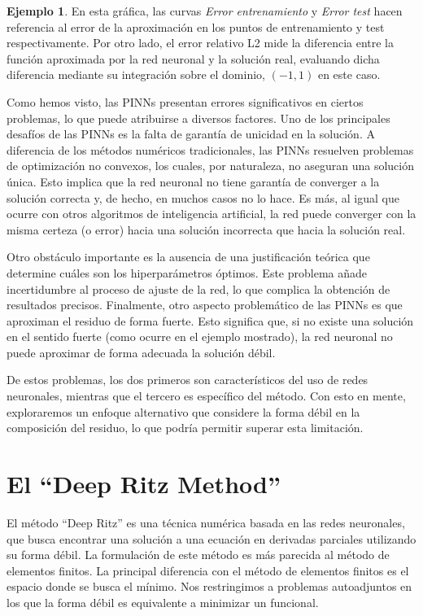 \documentclass[a4paper,11pt,spanish, twoside, leqno]{tfg-uam}
\theoremstyle{definition}
\newtheorem{exmp}[teor]{Ejemplo}
\begin{document}
\begin{mdframed}
\begin{exmp}
        En esta gráfica, las curvas \textit{Error entrenamiento} y \textit{Error test} hacen referencia al error de la aproximación en los puntos de entrenamiento y test respectivamente. Por otro lado, el error relativo L2 mide la diferencia entre la función aproximada por la red neuronal y la solución real, evaluando dicha diferencia mediante su integración sobre el dominio, $(-1,1)$ en este caso.

    \end{exmp}
\end{mdframed}

Como hemos visto, las PINNs presentan errores significativos en ciertos problemas, lo que puede atribuirse a diversos factores. Uno de los principales desafíos de las PINNs es la falta de garantía de unicidad en la solución. A diferencia de los métodos numéricos tradicionales, las PINNs resuelven problemas de optimización no convexos, los cuales, por naturaleza, no aseguran una solución única. Esto implica que la red neuronal no tiene garantía de converger a la solución correcta y, de hecho, en muchos casos no lo hace. Es más, al igual que ocurre con otros algoritmos de inteligencia artificial, la red puede converger con la misma certeza (o error) hacia una solución incorrecta que hacia la solución real.

Otro obstáculo importante es la ausencia de una justificación teórica que determine cuáles son los hiperparámetros óptimos. Este problema añade incertidumbre al proceso de ajuste de la red, lo que complica la obtención de resultados precisos. Finalmente, otro aspecto problemático de las PINNs es que aproximan el residuo de forma fuerte. Esto significa que, si no existe una solución en el sentido fuerte (como ocurre en el ejemplo mostrado), la red neuronal no puede aproximar de forma adecuada la solución débil.

De estos problemas, los dos primeros son característicos del uso de redes neuronales, mientras que el tercero es específico del método. Con esto en mente, exploraremos un enfoque alternativo que considere la forma débil en la composición del residuo, lo que podría permitir superar esta limitación.


\section{El ``Deep Ritz Method''} \label{sec:DeepRitz}

El método ``Deep Ritz'' es una técnica numérica basada en las redes neuronales, que busca encontrar una solución a una ecuación en derivadas parciales utilizando su forma débil. La formulación de este método es más parecida al método de elementos finitos. La principal diferencia con el método de elementos finitos es el espacio donde se busca el mínimo. Nos restringimos a problemas autoadjuntos en los que la forma débil es equivalente a minimizar un funcional.
\end{document}

